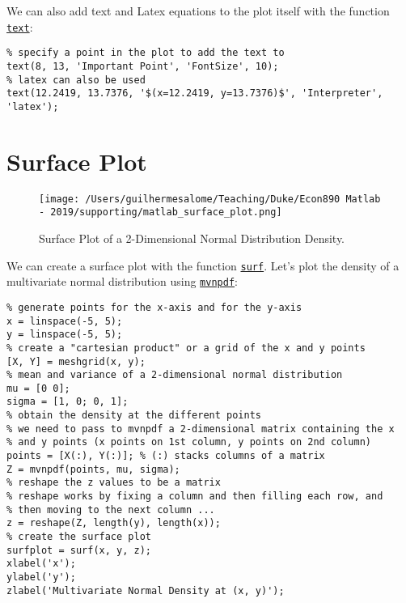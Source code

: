\documentclass[12pt, a4paper]{article}
\begin{document}
We can also add text and Latex equations to the plot itself with the function \href{https://www.mathworks.com/help/matlab/ref/text.html}{\texttt{text}}:
\lstset{language=matlab,label= ,caption= ,captionpos=b,firstnumber=1,numbers=left,style=Matlab-editor}
\begin{lstlisting}
% specify a point in the plot to add the text to
text(8, 13, 'Important Point', 'FontSize', 10);
% latex can also be used
text(12.2419, 13.7376, '$(x=12.2419, y=13.7376)$', 'Interpreter', 'latex');
\end{lstlisting}
\section{Surface Plot}
\label{sec:org644f29d}
\begin{figure}[H]
\centering
\texttt{[image: /Users/guilhermesalome/Teaching/Duke/Econ890 Matlab - 2019/supporting/matlab\_surface\_plot.png]}
\caption{\label{fig:orgba05dfd}
Surface Plot of a 2-Dimensional Normal Distribution Density.}
\end{figure}

We can create a surface plot with the function \href{https://www.mathworks.com/help/matlab/ref/surf.html}{\texttt{surf}}.
Let's plot the density of a multivariate normal distribution using \href{https://www.mathworks.com/help/stats/mvnpdf.html}{\texttt{mvnpdf}}:
\lstset{language=matlab,label= ,caption= ,captionpos=b,firstnumber=1,numbers=left,style=Matlab-editor}
\begin{lstlisting}
% generate points for the x-axis and for the y-axis
x = linspace(-5, 5);
y = linspace(-5, 5);
% create a "cartesian product" or a grid of the x and y points
[X, Y] = meshgrid(x, y);
% mean and variance of a 2-dimensional normal distribution
mu = [0 0];
sigma = [1, 0; 0, 1];
% obtain the density at the different points
% we need to pass to mvnpdf a 2-dimensional matrix containing the x
% and y points (x points on 1st column, y points on 2nd column)
points = [X(:), Y(:)]; % (:) stacks columns of a matrix
Z = mvnpdf(points, mu, sigma);
% reshape the z values to be a matrix
% reshape works by fixing a column and then filling each row, and
% then moving to the next column ...
z = reshape(Z, length(y), length(x));
% create the surface plot
surfplot = surf(x, y, z);
xlabel('x');
ylabel('y');
zlabel('Multivariate Normal Density at (x, y)');
\end{lstlisting}
\end{document}
